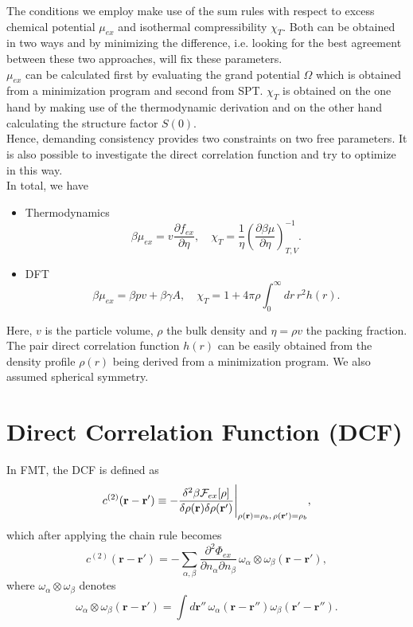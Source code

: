 \documentclass{article}
\begin{document}
The conditions we employ make use of the sum rules with respect to excess chemical potential $\mu_{ex}$ and isothermal compressibility $\chi_T$. Both can be obtained in two ways and by minimizing the difference, i.e. looking for the best agreement between these two approaches, will fix these parameters.\\
$\mu_{ex}$ can be calculated first by evaluating the grand potential $\Omega$ which is obtained from a minimization program and second from SPT. $\chi_T$ is obtained on the one hand by making use of the thermodynamic derivation and on the other hand calculating the structure factor $S(0)$.\\
Hence, demanding consistency provides two constraints on two free parameters.
It is also possible to investigate the direct correlation function and try to optimize in this way.\\   
In total, we have
\begin{itemize}
	\item Thermodynamics\\
		
		\begin{equation}
			\beta\mu_{ex} = v\frac{\partial f_{ex}}{\partial\eta},\quad \chi_T = \frac{1}{\eta}\left(\frac{\partial\beta\mu}{\partial\eta}\right)_{T,V}^{-1}.
		\end{equation}
		
	\item DFT\\
	
		\begin{equation}
			\beta\mu_{ex} = \beta pv + \beta\gamma A,\quad \chi_T = 1 + 4\pi\rho\int_0^{\infty}dr\,r^2h(r).
		\end{equation}
\end{itemize}
Here, $v$ is the particle volume, $\rho$ the bulk density and $\eta = \rho v$ the packing fraction. The pair direct correlation function $h(r)$ can be easily obtained from the density profile $\rho(r)$ being derived from a minimization program. We also assumed spherical symmetry.

\section{Direct Correlation Function (DCF)}

In FMT, the DCF is defined as
\begin{equation}
	c^{(2)}(\mathbf{r}-\mathbf{r}') \equiv -\frac{\delta^2\beta{\cal F}_{ex}[\rho]}{\delta\rho(\mathbf{r})\delta\rho(\mathbf{r}')}\Bigg|_{\rho(\mathbf{r})=\rho_b,\,\rho(\mathbf{r}')=\rho_b},
\end{equation}
which after applying the chain rule becomes
\begin{equation}
	c^{(2)}(\mathbf{r}-\mathbf{r}') = -\sum_{\alpha,\beta}\frac{\partial^2\Phi_{ex}}{\partial n_\alpha\partial n_\beta}\,\omega_\alpha\otimes\omega_\beta(\mathbf{r}-\mathbf{r}'),
\end{equation}
where $\omega_\alpha\otimes\omega_\beta$ denotes
\begin{equation}
	\omega_\alpha\otimes\omega_\beta(\mathbf{r}-\mathbf{r}')= \int d\mathbf{r}''\,\omega_\alpha(\mathbf{r}-\mathbf{r}'')\omega_\beta(\mathbf{r}'-\mathbf{r}'').
\end{equation}
\end{document}
